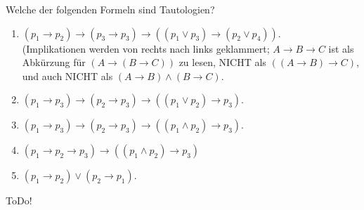 
\begin{exercise}[21]

Welche der folgenden Formeln sind Tautologien?

\begin{enumerate}[label = \alph*.]
    \item $(p_1 \to p_2) \to (p_3 \to p_3) \to ((p_1 \lor p_3) \to (p_2 \lor p_4))$. \\
    (Implikationen werden von rechts nach links geklammert;
    $A \to B \to C$ ist als Abkürzung für $(A \to (B \to C))$ zu lesen, NICHT als $((A \to B) \to C)$, und auch NICHT als $(A \to B) \land (B \to C)$.
    \item $(p_1 \to p_3) \to (p_2 \to p_3) \to ((p_1 \lor p_2) \to p_3)$.
    \item $(p_1 \to p_3) \to (p_2 \to p_3) \to ((p_1 \land p_2) \to p_3)$.
    \item $(p_1 \to p_2 \to p_3) \to ((p_1 \land p_2) \to p_3)$
    \item $(p_1 \to p_2) \lor (p_2 \to p_1)$.
\end{enumerate}

\end{exercise}


\begin{solution}

ToDo!

\end{solution}

